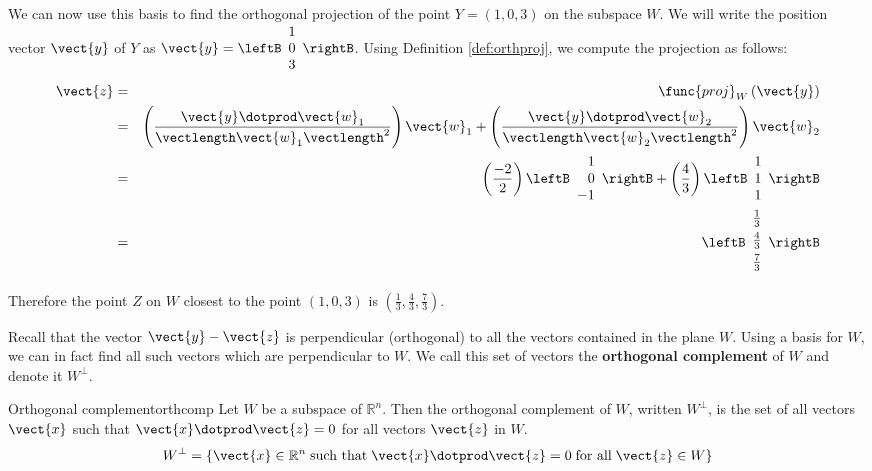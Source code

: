 \begin{solution}
We can now use this basis to find the orthogonal projection of the
point $Y=(1,0,3)$ on the subspace $W$. We will write the position
vector $\vect{y}$ of $Y$ as $\vect{y} = \leftB \begin{array}{c} 1 \\ 0 \\ 3
\end{array} \rightB$. Using Definition \ref{def:orthproj}, we compute the projection as follows:
\begin{eqnarray*}
\vect{z} &=& \func{proj}_{W}\left( \vect{y}\right)\\
&=&
\left( \frac{\vect{y} \dotprod \vect{w}_1}{ \vectlength \vect{w}_1 \vectlength^2}\right) \vect{w}_1
+
\left( \frac{\vect{y} \dotprod \vect{w}_2}{ \vectlength \vect{w}_2 \vectlength^2}\right) \vect{w}_2 \\
&=&
\left( \frac{-2}{2} \right) \leftB
\begin{array}{r}
1 \\
0 \\
-1
\end{array}
\rightB
+
\left( \frac{4}{3} \right)
\leftB
\begin{array}{c}
1 \\
1 \\
1 
\end{array}
\rightB \\
&=& 
\leftB
\begin{array}{c}
\vspace{0.05in}\frac{1}{3} \\
\vspace{0.05in}\frac{4}{3} \\
\vspace{0.05in}\frac{7}{3} 
\end{array}
\rightB
\end{eqnarray*}

Therefore the point $Z$ on $W$ closest to the point $(1,0,3)$  is $\left( \frac{1}{3}, \frac{4}{3}, \frac{7}{3} \right)$. 

\end{solution}

Recall that the vector $\vect{y} - \vect{z}$ is perpendicular
(orthogonal) to all the vectors contained in the plane $W$. Using a
basis for $W$, we can in fact find all such vectors which are
perpendicular to $W$. We call this set of vectors the
\textbf{orthogonal complement} of $W$ and
denote it $W^{\perp}$.

\begin{definition}{Orthogonal complement}{orthcomp}
Let $W$ be a subspace of $\mathbb{R}^n$. Then the orthogonal
complement of $W$, written $W^{\perp}$, is the set of all vectors
$\vect{x}$ such that $\vect{x} \dotprod \vect{z} = 0$ for all vectors
$\vect{z}$ in $W$.
\[
W^{\perp} = \{ \vect{x} \in \mathbb{R}^n \; \mbox{such that} \;
\vect{x} \dotprod \vect{z} = 0 \; \mbox{for all} \; \vect{z} \in W \}
\]
\end{definition}

